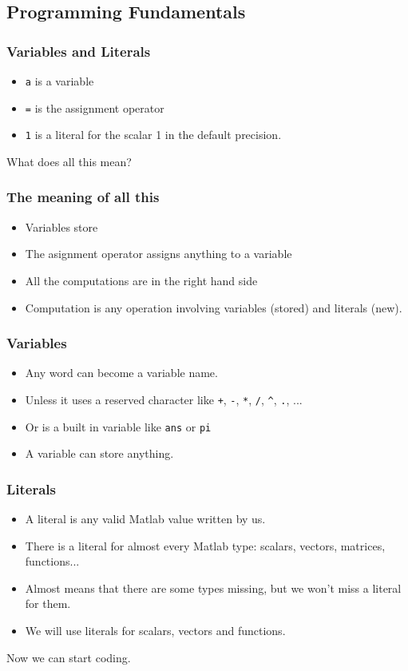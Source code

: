 \documentclass[12pt]{beamer}
\begin{document}
\subsection{Programming Fundamentals}

\begin{frame}
  \frametitle{Variables and Literals}
\testcode
\begin{itemize}
\item \texttt{a} is a variable
\item \texttt{=} is the assignment operator
\item \texttt{1} is a literal for the scalar 1 in the default
  precision.
\end{itemize}
\begin{center}
  What does all this mean?
\end{center}
\end{frame}

\begin{frame}
  \frametitle{The meaning of all this}
  \begin{itemize}
  \item Variables store
  \item The asignment operator assigns anything to a variable
  \item All the computations are in the right hand side
  \item Computation is any operation involving variables (stored) and
    literals (new).
  \end{itemize}
\end{frame}

\begin{frame}
  \frametitle{Variables}
  \begin{itemize}
  \item Any word can become a variable name.
  \item Unless it uses a reserved character like \texttt{+},
    \texttt{-}, \texttt{*}, \texttt{/}, \texttt{\^}, \texttt{.}, ...
  \item Or is a built in variable like \texttt{ans} or \texttt{pi}
  \item A variable can store anything.
  \end{itemize}
\end{frame}

\begin{frame}
  \frametitle{Literals}
  \begin{itemize}
  \item A literal is any valid Matlab value written by us.
  \item There is a literal for almost every Matlab type: scalars,
    vectors, matrices, functions...
  \item Almost means that there are some types missing, but we won't
    miss a literal for them.
  \item We will use literals for scalars, vectors and functions.
  \end{itemize}
Now we can start coding.
\end{frame}
\end{document}
